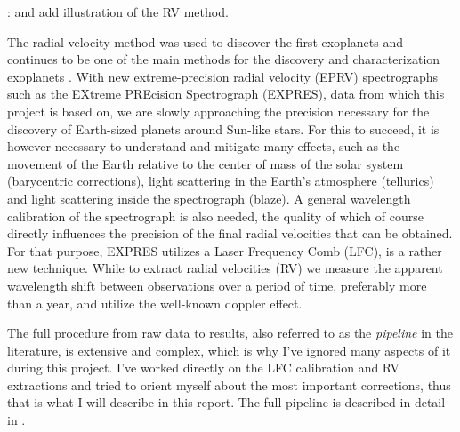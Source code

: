 : and add illustration of the RV method. 

The radial velocity method was used to discover the first exoplanets and continues to be one of the main methods for the discovery and characterization exoplanets \cite{radial_velocity_techniques}. With new extreme-precision radial velocity (EPRV) spectrographs such as the EXtreme PREcision Spectrograph (EXPRES), data from which this project is based on, we are slowly approaching the precision necessary for the discovery of Earth-sized planets around Sun-like stars. For this to succeed, it is however necessary to understand and mitigate many effects, such as the movement of the Earth relative to the center of mass of the solar system (barycentric corrections), light scattering in the Earth's atmosphere (tellurics) and light scattering inside the spectrograph (blaze). 
A general wavelength calibration of the spectrograph is also needed, the quality of which of course directly influences the precision of the final radial velocities that can be obtained. For that purpose, EXPRES utilizes a Laser Frequency Comb (LFC), is a rather new technique. While to extract radial velocities (RV) we measure the apparent wavelength shift between observations over a period of time, preferably more than a year, and utilize the well-known doppler effect. 

The full procedure from raw data to results, also referred to as the \emph{pipeline} in the literature, is extensive and complex, which is why I've ignored many aspects of it during this project. I've worked directly on the LFC calibration and RV extractions and tried to orient myself about the most important corrections, thus that is what I will describe in this report. The full pipeline is described in detail in \cite{first_RV_from_EXPRES}. 